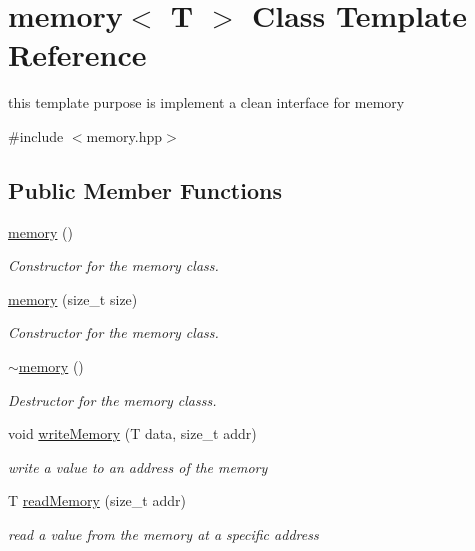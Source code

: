 \hypertarget{classmemory}{}\section{memory$<$ T $>$ Class Template Reference}
\label{classmemory}


this template purpose is implement a clean interface for memory  




{\ttfamily \#include $<$memory.\+hpp$>$}

\subsection*{Public Member Functions}
\begin{DoxyCompactItemize}
\item 
\hyperlink{classmemory_ad274a4a90764ee24a1867a37a18c32d2}{memory} ()\hypertarget{classmemory_ad274a4a90764ee24a1867a37a18c32d2}{}\label{classmemory_ad274a4a90764ee24a1867a37a18c32d2}

\begin{DoxyCompactList}\small\item\em Constructor for the memory class. \end{DoxyCompactList}\item 
\hyperlink{classmemory_a5d09716555c6b76bb2d1ca8d84a25db9}{memory} (size\+\_\+t size)
\begin{DoxyCompactList}\small\item\em Constructor for the memory class. \end{DoxyCompactList}\item 
\hyperlink{classmemory_a536de4277d0461a191ccf671c2b58831}{$\sim$memory} ()\hypertarget{classmemory_a536de4277d0461a191ccf671c2b58831}{}\label{classmemory_a536de4277d0461a191ccf671c2b58831}

\begin{DoxyCompactList}\small\item\em Destructor for the memory classs. \end{DoxyCompactList}\item 
void \hyperlink{classmemory_a5aef8ab99f7d4a8722fc789e6a9fc992}{write\+Memory} (T data, size\+\_\+t addr)
\begin{DoxyCompactList}\small\item\em write a value to an address of the memory \end{DoxyCompactList}\item 
T \hyperlink{classmemory_abc654cbc7c29d20b24daea0ff809c127}{read\+Memory} (size\+\_\+t addr)
\begin{DoxyCompactList}\small\item\em read a value from the memory at a specific address \end{DoxyCompactList}\end{DoxyCompactItemize}


